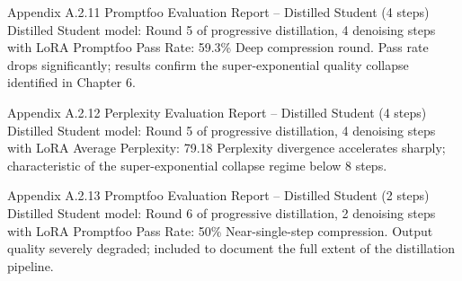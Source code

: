 \documentclass[11pt, a4paper]{article}
\begin{document}
\annexcover%
    {Appendix A.2.11}%
    {Promptfoo Evaluation Report – Distilled Student (4 steps)}%
    {Distilled Student model: Round 5 of progressive distillation, 4 denoising steps with LoRA}%
    {Promptfoo Pass Rate: 59.3\%}%
    {Deep compression round. Pass rate drops significantly; results confirm the super-exponential quality collapse identified in Chapter 6.}

\annexcover%
    {Appendix A.2.12}%
    {Perplexity Evaluation Report – Distilled Student (4 steps)}%
    {Distilled Student model: Round 5 of progressive distillation, 4 denoising steps with LoRA}%
    {Average Perplexity: 79.18}%
    {Perplexity divergence accelerates sharply; characteristic of the super-exponential collapse regime below 8 steps.}

\annexcover%
    {Appendix A.2.13}%
    {Promptfoo Evaluation Report – Distilled Student (2 steps)}%
    {Distilled Student model: Round 6 of progressive distillation, 2 denoising steps with LoRA}%
    {Promptfoo Pass Rate: 50\%}%
    {Near-single-step compression. Output quality severely degraded; included to document the full extent of the distillation pipeline.}
\end{document}
